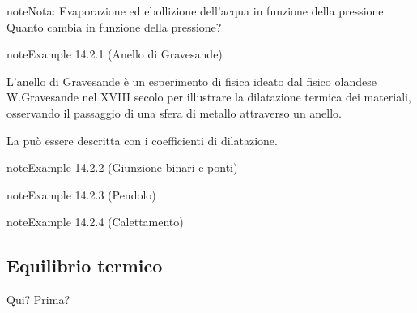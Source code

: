 \documentclass[letterpaper,10pt,italian]{jupyterBook}
\begin{document}
\begin{sphinxadmonition}{note}{Nota:}
\sphinxAtStartPar
Evaporazione ed ebollizione dell’acqua in funzione della pressione. Quanto cambia in funzione della pressione?
\end{sphinxadmonition}


\label{ch/thermodynamics/foundation-experiments:thermodynamics:history:th-expansion:gravesande}
\begin{sphinxadmonition}{note}{Example 14.2.1 (Anello di Gravesande)}



\sphinxAtStartPar
L’anello di Gravesande è un esperimento di fisica ideato dal fisico olandese W.Gravesande nel XVIII secolo per illustrare la dilatazione termica dei materiali, osservando il passaggio di una sfera di metallo attraverso un anello.

\sphinxAtStartPar
La {\hyperref[\detokenize{ch/thermodynamics/elastic-solid-1d:physics-hs-thermodynamics-matter-elastic-1d-dilation}]{}} può essere descritta con i coefficienti di dilatazione.
\end{sphinxadmonition}
\label{ch/thermodynamics/foundation-experiments:thermodynamics:history:th-expansion:junctions}
\begin{sphinxadmonition}{note}{Example 14.2.2 (Giunzione binari e ponti)}


\end{sphinxadmonition}
\label{ch/thermodynamics/foundation-experiments:thermodynamics:history:th-expansion:pendulum}
\begin{sphinxadmonition}{note}{Example 14.2.3 (Pendolo)}


\end{sphinxadmonition}
\label{ch/thermodynamics/foundation-experiments:thermodynamics:history:th-exapnsion:interference}
\begin{sphinxadmonition}{note}{Example 14.2.4 (Calettamento)}


\end{sphinxadmonition}




\subsection{Equilibrio termico}
\label{\detokenize{ch/thermodynamics/foundation-experiments:equilibrio-termico}}\label{\detokenize{ch/thermodynamics/foundation-experiments:physics-hs-thermodynamics-foundation-experiments-th-equilibrium}}
\sphinxAtStartPar
  Qui? Prima? 
\end{document}
